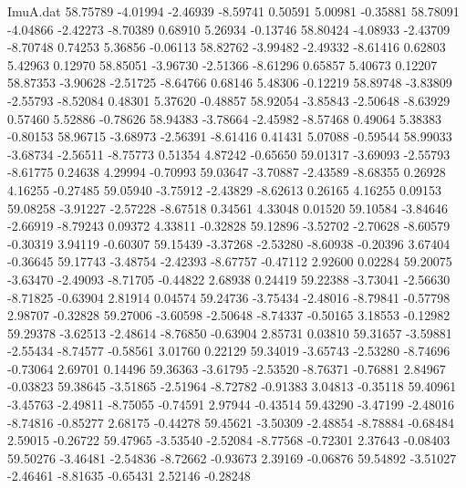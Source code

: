 \begin{filecontents}{ImuA.dat}
  58.75789   -4.01994   -2.46939   -8.59741    0.50591    5.00981   -0.35881
  58.78091   -4.04866   -2.42273   -8.70389    0.68910    5.26934   -0.13746
  58.80424   -4.08933   -2.43709   -8.70748    0.74253    5.36856   -0.06113
  58.82762   -3.99482   -2.49332   -8.61416    0.62803    5.42963    0.12970
  58.85051   -3.96730   -2.51366   -8.61296    0.65857    5.40673    0.12207
  58.87353   -3.90628   -2.51725   -8.64766    0.68146    5.48306   -0.12219
  58.89748   -3.83809   -2.55793   -8.52084    0.48301    5.37620   -0.48857
  58.92054   -3.85843   -2.50648   -8.63929    0.57460    5.52886   -0.78626
  58.94383   -3.78664   -2.45982   -8.57468    0.49064    5.38383   -0.80153
  58.96715   -3.68973   -2.56391   -8.61416    0.41431    5.07088   -0.59544
  58.99033   -3.68734   -2.56511   -8.75773    0.51354    4.87242   -0.65650
  59.01317   -3.69093   -2.55793   -8.61775    0.24638    4.29994   -0.70993
  59.03647   -3.70887   -2.43589   -8.68355    0.26928    4.16255   -0.27485
  59.05940   -3.75912   -2.43829   -8.62613    0.26165    4.16255    0.09153
  59.08258   -3.91227   -2.57228   -8.67518    0.34561    4.33048    0.01520
  59.10584   -3.84646   -2.66919   -8.79243    0.09372    4.33811   -0.32828
  59.12896   -3.52702   -2.70628   -8.60579   -0.30319    3.94119   -0.60307
  59.15439   -3.37268   -2.53280   -8.60938   -0.20396    3.67404   -0.36645
  59.17743   -3.48754   -2.42393   -8.67757   -0.47112    2.92600    0.02284
  59.20075   -3.63470   -2.49093   -8.71705   -0.44822    2.68938    0.24419
  59.22388   -3.73041   -2.56630   -8.71825   -0.63904    2.81914    0.04574
  59.24736   -3.75434   -2.48016   -8.79841   -0.57798    2.98707   -0.32828
  59.27006   -3.60598   -2.50648   -8.74337   -0.50165    3.18553   -0.12982
  59.29378   -3.62513   -2.48614   -8.76850   -0.63904    2.85731    0.03810
  59.31657   -3.59881   -2.55434   -8.74577   -0.58561    3.01760    0.22129
  59.34019   -3.65743   -2.53280   -8.74696   -0.73064    2.69701    0.14496
  59.36363   -3.61795   -2.53520   -8.76371   -0.76881    2.84967   -0.03823
  59.38645   -3.51865   -2.51964   -8.72782   -0.91383    3.04813   -0.35118
  59.40961   -3.45763   -2.49811   -8.75055   -0.74591    2.97944   -0.43514
  59.43290   -3.47199   -2.48016   -8.74816   -0.85277    2.68175   -0.44278
  59.45621   -3.50309   -2.48854   -8.78884   -0.68484    2.59015   -0.26722
  59.47965   -3.53540   -2.52084   -8.77568   -0.72301    2.37643   -0.08403
  59.50276   -3.46481   -2.54836   -8.72662   -0.93673    2.39169   -0.06876
  59.54892   -3.51027   -2.46461   -8.81635   -0.65431    2.52146   -0.28248

\end{filecontents}
